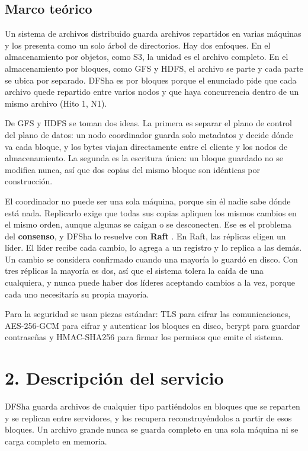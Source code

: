 \documentclass[10pt]{article}
\begin{document}
\subsection{Marco teórico}

Un sistema de archivos distribuido guarda archivos repartidos en varias máquinas y los presenta como un solo árbol de directorios. Hay dos enfoques. En el almacenamiento por objetos, como S3, la unidad es el archivo completo. En el almacenamiento por bloques, como GFS y HDFS, el archivo se parte y cada parte se ubica por separado. DFSha es por bloques porque el enunciado pide que cada archivo quede repartido entre varios nodos y que haya concurrencia dentro de un mismo archivo (Hito 1, N1).

De GFS y HDFS se toman dos ideas. La primera es separar el plano de control del plano de datos: un nodo coordinador guarda solo metadatos y decide dónde va cada bloque, y los bytes viajan directamente entre el cliente y los nodos de almacenamiento. La segunda es la escritura única: un bloque guardado no se modifica nunca, así que dos copias del mismo bloque son idénticas por construcción.

El coordinador no puede ser una sola máquina, porque sin él nadie sabe dónde está nada. Replicarlo exige que todas sus copias apliquen los mismos cambios en el mismo orden, aunque algunas se caigan o se desconecten. Ese es el problema del \textbf{consenso}, y DFSha lo resuelve con \textbf{Raft} . En Raft, las réplicas eligen un líder. El líder recibe cada cambio, lo agrega a un registro y lo replica a las demás. Un cambio se considera confirmado cuando una mayoría lo guardó en disco. Con tres réplicas la mayoría es dos, así que el sistema tolera la caída de una cualquiera, y nunca puede haber dos líderes aceptando cambios a la vez, porque cada uno necesitaría su propia mayoría.

Para la seguridad se usan piezas estándar: TLS para cifrar las comunicaciones, AES-256-GCM para cifrar y autenticar los bloques en disco, bcrypt para guardar contraseñas y HMAC-SHA256 para firmar los permisos que emite el sistema.

\separador

\section{2. Descripción del servicio}

DFSha guarda archivos de cualquier tipo partiéndolos en bloques que se reparten y se replican entre servidores, y los recupera reconstruyéndolos a partir de esos bloques. Un archivo grande nunca se guarda completo en una sola máquina ni se carga completo en memoria.
\end{document}
